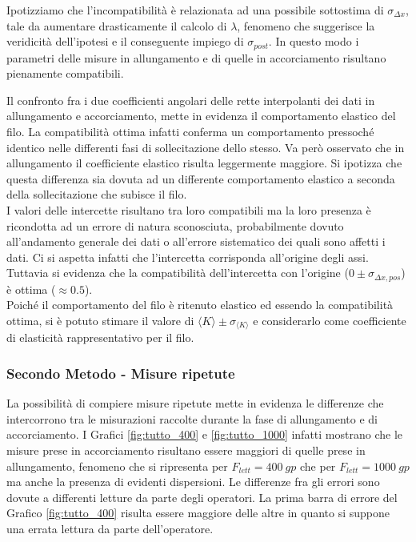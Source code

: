 \documentclass[a4paper,11pt,oneside]{article}
\begin{document}
Ipotizziamo che l'incompatibilità è relazionata ad una possibile sottostima di $\sigma_{\Delta x}$, tale da aumentare drasticamente il calcolo di $\lambda$, fenomeno che suggerisce la veridicità dell'ipotesi e il conseguente impiego di $\sigma_{post}$. In questo modo i parametri delle misure in allungamento e di quelle in accorciamento risultano pienamente compatibili.

Il confronto fra i due coefficienti angolari delle rette interpolanti dei dati in allungamento e accorciamento, mette in evidenza il comportamento elastico del filo. La compatibilità ottima infatti conferma un comportamento pressoché identico nelle differenti fasi di sollecitazione dello stesso. Va però osservato che in allungamento il coefficiente elastico risulta leggermente maggiore. Si ipotizza che questa differenza sia dovuta ad un differente comportamento elastico a seconda della sollecitazione che subisce il filo.\\

I valori delle intercette risultano tra loro compatibili ma la loro presenza è ricondotta ad un errore di natura sconosciuta, probabilmente dovuto all'andamento generale dei dati o all'errore sistematico dei quali sono affetti i dati. Ci si aspetta infatti che l'intercetta corrisponda all'origine degli assi. Tuttavia si evidenza che la compatibilità dell'intercetta con l'origine ($0\pm \sigma_{\Delta x, pos}$) è ottima ($\approx \num{0.5}$).\\

Poiché il comportamento del filo è ritenuto elastico ed essendo la compatibilità ottima, si è potuto stimare il valore di $\langle K \rangle \pm \sigma_{\langle K \rangle}$ e considerarlo come coefficiente di elasticità rappresentativo per il filo.\\

\subsubsection*{Secondo Metodo - Misure ripetute}
\begin{figure}[h!]
    \centering
\end{figure}

La possibilità di compiere misure ripetute mette in evidenza le differenze che intercorrono tra le misurazioni raccolte durante la fase di allungamento e di accorciamento. I Grafici \ref{fig:tutto_400} e \ref{fig:tutto_1000} infatti mostrano che le misure prese in accorciamento risultano essere maggiori di quelle prese in allungamento, fenomeno che si ripresenta per $F_{lett}=\SI{400}{gp}$ che per $F_{lett}=\SI{1000}{gp}$ ma anche la presenza di evidenti dispersioni. Le differenze fra gli errori sono dovute a differenti letture da parte degli operatori. La prima barra di errore del Grafico \ref{fig:tutto_400} risulta essere maggiore delle altre in quanto si suppone una errata lettura da parte dell'operatore.
\end{document}
